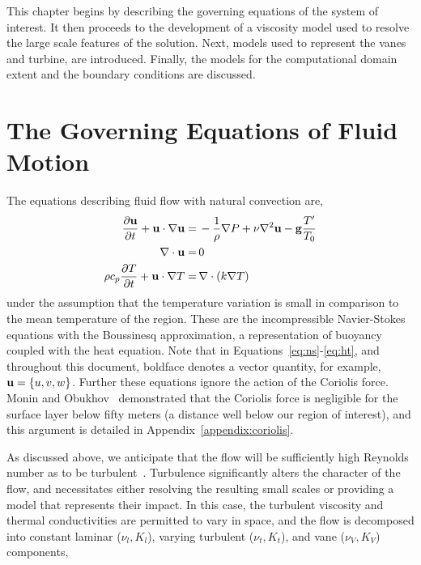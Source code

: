 This chapter begins by describing the governing equations of the system
of interest. It then proceeds to the development of a viscosity model
used to resolve the large scale features of the solution. Next, models
used to represent the vanes and turbine, are introduced.  Finally, the
models for the computational domain extent and the boundary conditions
are discussed. 


\section{The Governing Equations of Fluid Motion}
\label{sub_sec:ns_en}

The equations describing fluid flow with natural convection are,
\begin{align}
  \frac{\partial {\bf u}}{\partial t} + {\bf u} \cdot \nabla {\bf u} =& \,
  -\frac{1}{\rho}\nabla P + \nu \nabla^2 {\bf u} - {\bf g} \frac{T'}{T_0}
 \label{eq:ns} \\
  \nabla \cdot {\bf u} =& \, 0 \label{eq:cont} \\
  \rho c_p \frac{\partial T}{\partial t} + {\bf u} \cdot \nabla T =& \, \nabla
 \cdot ( k \nabla T) \label{eq:ht}
\end{align} 
under the assumption that the temperature variation is small in
comparison to the mean temperature of the region. These are the
incompressible Navier-Stokes equations with the Boussinesq
approximation\cite{boussinesq2010théorie}, a representation of buoyancy
coupled with the heat equation. Note that in
Equations~\ref{eq:ns}-\ref{eq:ht}, and throughout this document,
boldface denotes a vector quantity, for example, ${\bf u} = \{u,v,w\}$.  
Further these equations ignore the action of the Coriolis force. 
Monin and Obukhov~\cite{monin1954basic} demonstrated that the Coriolis
force is negligible for the surface layer below fifty meters (a distance
well below our region of interest), and this argument is detailed in
Appendix~\ref{appendix:coriolis}.  

As discussed above, we anticipate that the flow will be sufficiently
high Reynolds number as to be
turbulent~\cite{Reynolds01011883}. Turbulence significantly alters the
character of the flow,  
and necessitates either resolving the resulting small scales or
providing a model that represents their impact. In this case, 
the turbulent viscosity and thermal conductivities are permitted to vary in
space, and the flow is decomposed into constant laminar
($\nu_{l},K_{l}$), varying turbulent ($\nu_{t},K_{t}$), and vane
($\nu_{V},K_{V}$) components, 

